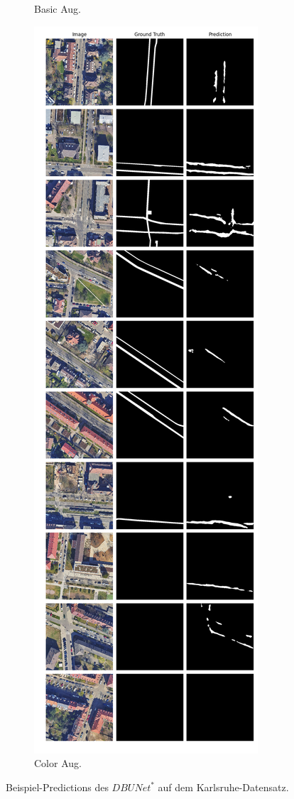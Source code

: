 \begin{figure}
\begin{subfigure}{.4\textwidth}
		\caption{Basic Aug.}
	\end{subfigure}
	\begin{subfigure}{.4\textwidth}
		\centering
		\includegraphics[width=1.\textwidth]{Bilder/karlsruhe-color-samples/dbunet-s.png}
		\caption{Color Aug.}
	\end{subfigure}
	\caption{Beispiel-Predictions des $DBUNet^*$ auf dem Karlsruhe-Datensatz.}
	\label{fig:ka-samples-dbunet-s}
	\end{figure}
	
